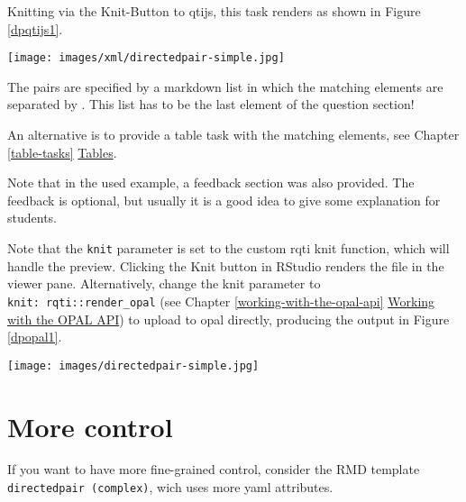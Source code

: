 \documentclass[twoside]{tufte-book}
\begin{document}
Knitting via the Knit-Button to qtijs, this task renders as shown in Figure \ref{dpqtijs1}.

\begin{figure*}
\centering
\texttt{[image: images/xml/directedpair-simple.jpg]}
\caption{\label{dpqtijs1}Directed pair task rendered with qtijs}
\end{figure*}

The pairs are specified by a markdown list in which the matching elements are separated by \texttt{\textbar{}}. This list has to be the last element of the question section!

An alternative is to provide a table task with the matching elements, see Chapter \ref{table-tasks} \href{table.html}{Tables}.

Note that in the used example, a feedback section was also provided. The feedback is optional, but usually it is a good idea to give some explanation for students.

Note that the \texttt{knit} parameter is set to the custom rqti knit function,
which will handle the preview. Clicking the Knit button in RStudio renders the file in the viewer pane. \noindent Alternatively, change the knit parameter to \texttt{knit:\ rqti::render\_opal} (see Chapter \ref{working-with-the-opal-api} \href{api_opal.html}{Working with the OPAL API}) to upload to opal directly, producing the output in Figure \ref{dpopal1}.

\begin{figure*}
\centering
\texttt{[image: images/directedpair-simple.jpg]}
\caption{\label{dpopal1}Directed pair task rendered in OPAL}
\end{figure*}

\section{More control}\label{more-control-6}

If you want to have more fine-grained control, consider the RMD template \texttt{directedpair\ (complex)}, wich uses more yaml attributes.
\end{document}
